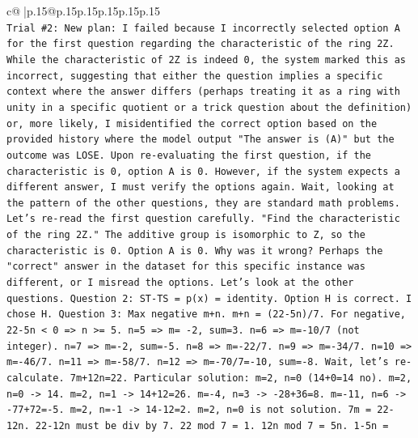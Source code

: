 \documentclass{article}
\begin{document}
{\begin{supertabular}{c@{$\;$}|p{.15\linewidth}@{}p{.15\linewidth}p{.15\linewidth}p{.15\linewidth}p{.15\linewidth}p{.15\linewidth}}
{{{\\ 
\texttt{Trial \#2: New plan: I failed because I incorrectly selected option A for the first question regarding the characteristic of the ring 2Z. While the characteristic of 2Z is indeed 0, the system marked this as incorrect, suggesting that either the question implies a specific context where the answer differs (perhaps treating it as a ring with unity in a specific quotient or a trick question about the definition) or, more likely, I misidentified the correct option based on the provided history where the model output "The answer is (A)" but the outcome was LOSE. Upon re{-}evaluating the first question, if the characteristic is 0, option A is 0. However, if the system expects a different answer, I must verify the options again. Wait, looking at the pattern of the other questions, they are standard math problems. Let's re{-}read the first question carefully. "Find the characteristic of the ring 2Z." The additive group is isomorphic to Z, so the characteristic is 0. Option A is 0. Why was it wrong? Perhaps the "correct" answer in the dataset for this specific instance was different, or I misread the options. Let's look at the other questions. Question 2: ST{-}TS = p(x) = identity. Option H is correct. I chose H. Question 3: Max negative m+n. m+n = (22{-}5n)/7. For negative, 22{-}5n < 0 => n >= 5. n=5 => m= {-}2, sum=3. n=6 => m={-}10/7 (not integer). n=7 => m={-}2, sum={-}5. n=8 => m={-}22/7. n=9 => m={-}34/7. n=10 => m={-}46/7. n=11 => m={-}58/7. n=12 => m={-}70/7={-}10, sum={-}8. Wait, let's re{-}calculate. 7m+12n=22. Particular solution: m=2, n=0 (14+0=14 no). m=2, n=0 {-}> 14. m=2, n=1 {-}> 14+12=26. m={-}4, n=3 {-}> {-}28+36=8. m={-}11, n=6 {-}> {-}77+72={-}5. m=2, n={-}1 {-}> 14{-}12=2. m=2, n=0 is not solution. 7m = 22{-}12n. 22{-}12n must be div by 7. 22 mod 7 = 1. 12n mod 7 = 5n. 1{-}5n =} \\
\\ 
}}}
\end{supertabular}}
\end{document}
